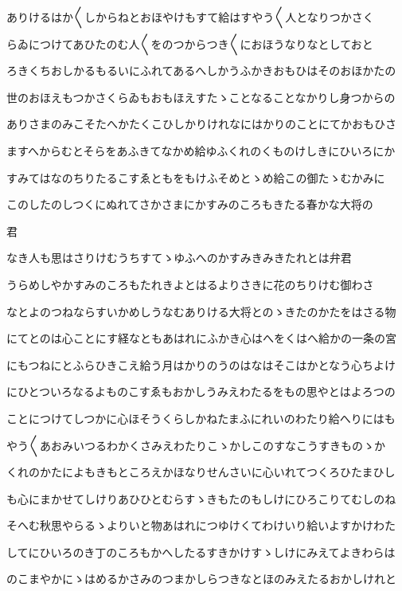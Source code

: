 \documentclass[a4paper,11pt,landscape]{ltjtarticle}
\begin{document}
ありけるはか〱しからねとおほやけもすて給はすやう〱人となりつかさく
\par\medskip
らゐにつけてあひたのむ人〱をのつからつき〱におほうなりなとしておと
\par\medskip
ろきくちおしかるもるいにふれてあるへしかうふかきおもひはそのおほかたの
\par\medskip
世のおほえもつかさくらゐもおもほえすたゝことなることなかりし身つからの
\par\medskip
ありさまのみこそたへかたくこひしかりけれなにはかりのことにてかおもひさ
\par\medskip
ますへからむとそらをあふきてなかめ給ゆふくれのくものけしきにひいろにか
\par\medskip
すみてはなのちりたるこすゑともをもけふそめとゝめ給この御たゝむかみに
\par\medskip
このしたのしつくにぬれてさかさまにかすみのころもきたる春かな大将の
\par\medskip
君
\par\medskip
なき人も思はさりけむうちすてゝゆふへのかすみきみきたれとは弁君
\par\medskip
うらめしやかすみのころもたれきよとはるよりさきに花のちりけむ御わさ
\par\medskip
なとよのつねならすいかめしうなむありける大将とのゝきたのかたをはさる物
\par\medskip
にてとのは心ことにす経なともあはれにふかき心はへをくはへ給かの一条の宮
\par\medskip
にもつねにとふらひきこえ給う月はかりのうのはなはそこはかとなう心ちよけ
\par\medskip
にひとついろなるよものこすゑもおかしうみえわたるをもの思やとはよろつの
\par\medskip
ことにつけてしつかに心ほそうくらしかねたまふにれいのわたり給へりにはも
\par\medskip
やう〱あおみいつるわかくさみえわたりこゝかしこのすなこうすきものゝか
\par\medskip
くれのかたによもきもところえかほなりせんさいに心いれてつくろひたまひし
\par\medskip
も心にまかせてしけりあひひとむらすゝきもたのもしけにひろこりてむしのね
\par\medskip
そへむ秋思やらるゝよりいと物あはれにつゆけくてわけいり給いよすかけわた
\par\medskip
してにひいろのき丁のころもかへしたるすきかけすゝしけにみえてよきわらは
\par\medskip
のこまやかにゝはめるかさみのつまかしらつきなとほのみえたるおかしけれと
\par\medskip
\end{document}
